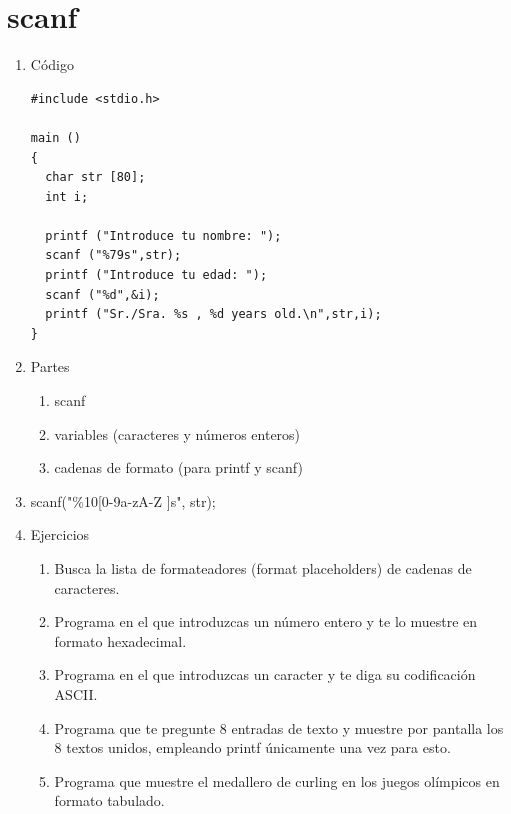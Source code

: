 \documentclass[a4paper,oneside]{article}
\begin{document}
\section{scanf}
  \begin{enumerate}
  \item Código

    \begin{verbatim}
#include <stdio.h>

main ()
{
  char str [80];
  int i;

  printf ("Introduce tu nombre: ");
  scanf ("%79s",str);  
  printf ("Introduce tu edad: ");
  scanf ("%d",&i);
  printf ("Sr./Sra. %s , %d years old.\n",str,i);
}
    \end{verbatim}
  \item Partes
    \begin{enumerate}
    \item scanf
    \item variables (caracteres y números enteros)
    \item cadenas de formato (para printf y scanf)
    \end{enumerate}
  \item{scanf("\%10[0-9a-zA-Z ]s", str);}

  \item Ejercicios
    \begin{enumerate}
    \item Busca la lista de formateadores (format placeholders) de cadenas de caracteres.
    \item Programa en el que introduzcas un número entero y te lo muestre en formato hexadecimal.
    \item Programa en el que introduzcas un caracter y te diga su codificación ASCII.
    \item Programa que te pregunte 8 entradas de texto y muestre por pantalla los 8 textos unidos, empleando printf únicamente una vez para esto.
    \item Programa que muestre el medallero de curling en los juegos olímpicos en formato tabulado.
    \end{enumerate}
  \end{enumerate}
\end{document}
